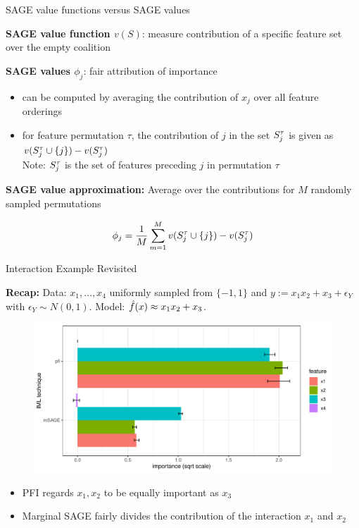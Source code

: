 \documentclass[11pt,compress,t,notes=noshow, aspectratio=169, xcolor=table]{beamer}
\begin{document}
\begin{frame}{SAGE value functions versus SAGE values}

\textbf{SAGE value function $v(S)$}: measure contribution of a specific feature set over the empty coalition

\lz\pause

\textbf{SAGE values $\phi_j$}: fair attribution of importance
\begin{itemize}
    \item can be computed by averaging the contribution of $x_j$ over all feature orderings
    \item for feature permutation $\tau$, the contribution of $j$ in the set $\Stau$ is given as $v(\Stauj) - v(\Stau)$\\
    Note: $\Stau$ is the set of features preceding $j$ in permutation $\tau$
\end{itemize}

\lz\pause

\textbf{SAGE value approximation:} Average over the contributions for $M$ randomly sampled permutations

\begin{align*}
    \phi_j = \frac{1}{M} \sum_{m=1}^M v(\Stauj) - v(\Stau)
\end{align*}
    
\end{frame}

\begin{frame}{Interaction Example Revisited}

\textbf{Recap:} Data: $x_1, \dots, x_4$ uniformly sampled from $\{-1, 1\}$ and $y:= x_1 x_2 + x_3 + \epsilon_Y$ with $\epsilon_Y \sim N(0, 1)$. Model: $\fh(x) \approx x_1 x_2 + x_3$.\\
%
\begin{figure}
  \includegraphics[width=0.65\linewidth]{figure_man/sage_pfi_interactions}
\end{figure}
%
\begin{itemize}
    \item PFI regards $x_1, x_2$ to be equally important as $x_3$
    \item Marginal SAGE fairly divides the contribution of the interaction $x_1$ and $x_2$
\end{itemize}

\end{frame}
\end{document}
